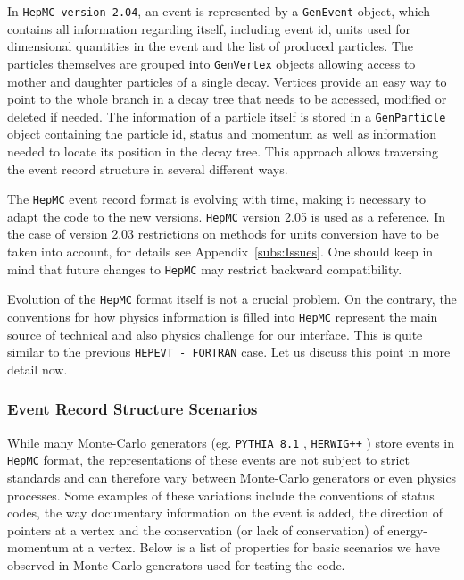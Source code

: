 \documentclass[]{Tauola_interface_design}
\begin{document}
In {\tt HepMC version 2.04}, an  event is represented by a {\tt GenEvent} object,
which contains all information regarding itself, including event id,
units used for dimensional quantities in the event and the list of produced particles. The particles
themselves are grouped into {\tt GenVertex} objects allowing access to mother
and daughter particles of a single decay. Vertices provide an easy way
to point to the whole branch in a decay tree that needs to be accessed,
modified or deleted if needed. The information of a particle  itself is stored
in a {\tt GenParticle} object containing the particle id, status and momentum
as well as information needed to locate its position in the decay tree.
This approach allows traversing the event record structure in several different
ways.

The {\tt HepMC} event record format is  evolving with time, making it necessary
 to adapt
the code to the new versions.
{\tt HepMC} version 2.05 is used as a reference. In the case of version 2.03 restrictions on methods for 
units
conversion have to be taken into account, for details see Appendix~\ref{subs:Issues}.
One should keep in mind that future changes to {\tt HepMC} may restrict
backward compatibility.

Evolution of the {\tt HepMC} format itself is not a crucial problem.
On the contrary, the conventions for how physics information is  filled into {\tt HepMC}
 represent the main source of technical and also physics 
challenge for our interface. 
This is quite similar to the previous
{\tt HEPEVT - FORTRAN} case. Let us discuss this point in more detail now.

\subsubsection{Event Record Structure Scenarios}
\label{sect:Scenarios}
While many Monte-Carlo generators (eg. {\tt PYTHIA 8.1} \cite{Sjostrand:2007gs}, 
{\tt HERWIG++} \cite{Bahr:2008pv})
store events in {\tt HepMC} format, the  representations of
these events are not subject to strict standards and can therefore
vary between Monte-Carlo generators or even physics processes. Some examples
of these variations include the conventions of status codes, the  way
documentary information on the event is added, the direction of pointers at a vertex
and the conservation (or lack of conservation) of energy-momentum at a vertex.
Below is a list of properties for basic scenarios we have observed in Monte-Carlo
generators used for testing the code.
\end{document}
